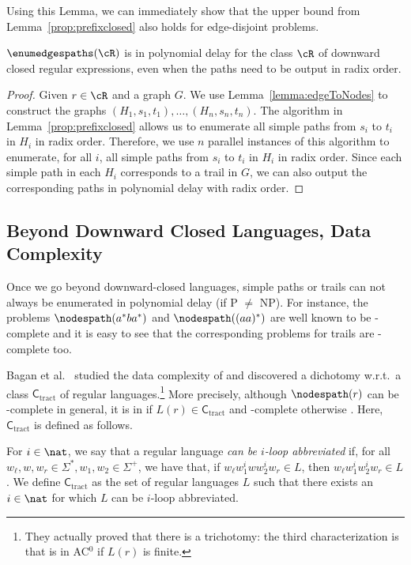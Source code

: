\documentclass[a4paper,english]{lipics-v2016}
\newcommand{\ctract}{\ensuremath{\textsf{C}_\text{tract}}\xspace}
\theoremstyle{plain}
\begin{document}
Using this Lemma, we can immediately show that the upper bound from Lemma~\ref{prop:prefixclosed} also holds for edge-disjoint problems.
\begin{corollary}
	$\enumedgespaths(\cR)$ is in polynomial delay for the class $\cR$ of
	downward closed regular expressions, even when the paths need to be
	output in radix order.
\end{corollary}
\begin{proof} Given $r \in \cR$ and a graph $G$. We use Lemma~\ref{lemma:edgeToNodes} to construct the graphs $(H_1,s_1,t_1),\allowbreak \ldots,\allowbreak (H_n,s_n,t_n)$. The algorithm in Lemma~\ref{prop:prefixclosed} allows us to enumerate all simple paths from $s_i$ to $t_i$ in $H_i$ in radix order. Therefore, we use $n$ parallel instances of this algorithm to enumerate, for all $i$, all simple paths from $s_i$ to $t_i$ in $H_i$ in radix order. Since each simple path in each $H_i$ corresponds to a trail in $G$, we can also output the corresponding paths in polynomial delay with radix order.
\end{proof}



\subsection{Beyond Downward Closed Languages, Data Complexity} \label{sec:BeyondDWC}

Once we go beyond downward-closed languages, simple paths or trails can not
always be enumerated in polynomial delay (if P $\neq$ NP). For instance, the
problems $\nodespath(a^*ba^*)$ and $\nodespath((aa)^*)$ are well known to be
\np-complete \cite{mendelzon} and it is easy to see that the
corresponding problems for trails are \np-complete too.

Bagan et al.\ \cite{bagan} studied the data complexity of \nodespath and
discovered a dichotomy w.r.t.\ a class $\ctract$ of regular
languages.\footnote{They actually proved that there is a trichotomy:
  the third characterization is that \nodespath is in AC$^0$ if $L(r)$ is
  finite.}
More precisely, although $\nodespath(r)$ can be \np-complete in general,
it is in \ptime if $L(r) \in \ctract$ and
\np-complete otherwise \cite[Theorem 2]{bagan}.  Here, $\ctract$ is defined as follows.
\begin{definition} \label{def:loopabbrev}
  For $i \in \nat$, we say that a regular language \emph{can be
    $i$-loop abbreviated} if, for all $w_\ell, w,w_r \in \Sigma^*,
  w_1, w_2 \in \Sigma^+$, we have that, if $w_\ell w_1^i w w_2^i w_r
  \in L$, then $w_\ell w_1^i w_2^i w_r \in L$. We define
  $\ctract$ as the set of regular languages $L$ such that there
  exists an $i \in \nat$ for which $L$ can be $i$-loop abbreviated.
    \end{definition}
\end{document}
